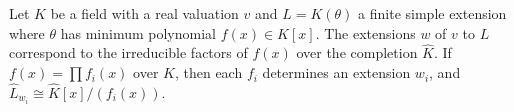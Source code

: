 Let $K$ be a field with a real valuation $v$ and $L = K(\theta)$ a finite simple extension where $\theta$ has minimum polynomial $f(x) \in K[x]$. The extensions $w$ of $v$ to $L$ correspond to the irreducible factors of $f(x)$ over the completion $\hat{K}$. If $f(x) = \prod f_i(x)$ over $\hat{K}$, then each $f_i$ determines an extension $w_i$, and $\hat{L}_{w_i} \cong \hat{K}[x]/(f_i(x))$.

